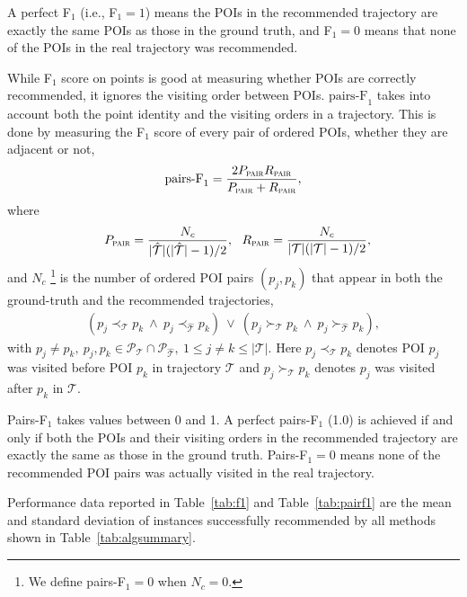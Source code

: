 A perfect F$_1$ (i.e., F$_1 = 1$) means the POIs in
the recommended trajectory are exactly the same POIs as those in the ground truth,
and F$_1 = 0$ means that none of the POIs in the
real trajectory was recommended.

While F$_1$ score on points is good at measuring whether POIs are correctly recommended,
it ignores the visiting order between POIs.
$\text{pairs-F}_1$ takes into account both the point identity and the visiting orders in a trajectory.
This is done by measuring the F$_1$ score of every pair of ordered POIs, whether they are adjacent or not,
\begin{displaymath}
\text{pairs-F}_1 = \frac{2 P_{\textsc{pair}} R_{\textsc{pair}}}
                        {P_{\textsc{pair}} + R_{\textsc{pair}}},
\end{displaymath}
where
\vspace{-2.0em}
\begin{displaymath}%
~~
P_{\textsc{pair}} = \frac{N_c} {|\hat{\mathcal{T}}|(|\hat{\mathcal{T}}|-1) / 2}, ~~
R_{\textsc{pair}} = \frac{N_c} {|\mathcal{T}|(|\mathcal{T}|-1) / 2},
\end{displaymath}
and $N_c$
\footnote{We define pairs-F$_1 = 0$ when $N_c = 0$.}
is the number of ordered POI pairs $(p_j, p_k)$ that
appear in both the ground-truth and the recommended trajectories,
\begin{align*}
    (p_j \prec_{\mathcal{T}} p_k ~\land~ p_j \prec_{\hat{\mathcal{T}}} p_k)  ~\lor~
    (p_j \succ_{\mathcal{T}} p_k ~\land~ p_j \succ_{\hat{\mathcal{T}}} p_k),
\end{align*}
with $p_j \ne p_k, ~p_j, p_k \in \mathcal{P}_{\mathcal{T}} \cap \mathcal{P}_{\hat{\mathcal{T}}}, ~1 \le j \ne k \le |\mathcal{T}|$.
Here $p_j \prec_{\mathcal{T}} p_k$ denotes POI $p_j$ was visited before POI $p_k$ in trajectory $\mathcal{T}$
and $p_j \succ_{\mathcal{T}} p_k$ denotes $p_j$ was visited after $p_k$ in $\mathcal{T}$.

Pairs-F$_1$ takes values between 0 and 1. A perfect pairs-F$_1$ (1.0) is achieved if and only if
both the POIs and their visiting orders in the recommended trajectory are exactly the same as those in the ground truth.
Pairs-F$_1 = 0$ means none of the recommended POI pairs was actually visited in the real trajectory.

Performance data reported in Table~\ref{tab:f1} and Table~\ref{tab:pairf1} are the mean and standard deviation of instances successfully recommended by
all methods shown in Table~\ref{tab:algsummary}.




